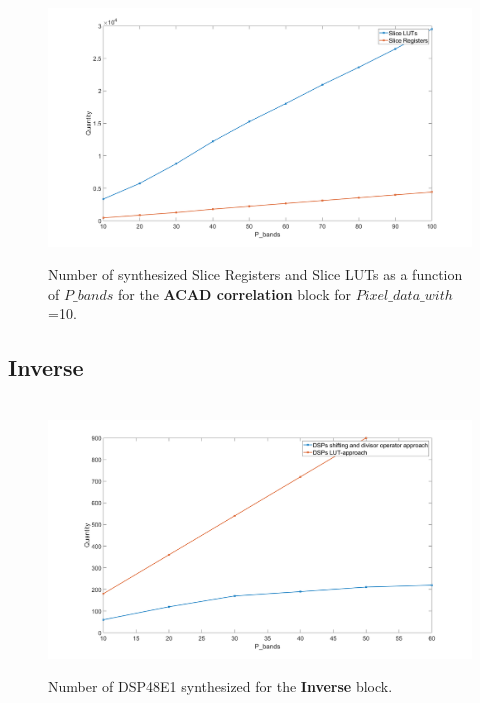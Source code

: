 \begin{figure}[H]

\hbox{\hspace*{-2cm}                                                           
   \includegraphics[scale=0.3]{images/syntese_resultat/acad_correlation_using_pixel_data_with_10_luts_and_registers.png}}
  \caption{Number of synthesized Slice Registers and Slice LUTs as a function of $P\_bands$ for the \textbf{ACAD correlation} block for $Pixel\_data\_with$ =10. } 
  \label{fig:correlation_luts_and_registers_10}
\end{figure}
 
 

\subsection{Inverse}



\begin{figure}[H]

\hbox{\hspace*{-1cm}                                                           
   \includegraphics[scale=0.27]{images/syntese_resultat/inverse/number_of_dsps.png}}
  \caption{Number of DSP48E1 synthesized for the \textbf{Inverse} block. } 
  \label{fig:dsps_inverse}
\end{figure}


